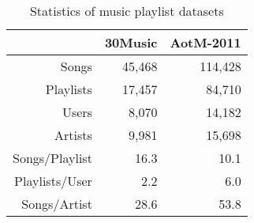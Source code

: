 \begin{table}[!t]
\centering
\caption{Statistics of music playlist datasets}
\label{tab:stats_pldata}
\begin{tabular}{rrr}
\toprule
               & 30Music & AotM-2011 \\
\midrule
Songs          & 45,468  & 114,428   \\
Playlists      & 17,457  & 84,710    \\
Users          & 8,070   & 14,182    \\
Artists        & 9,981   & 15,698    \\
Songs/Playlist & 16.3    & 10.1      \\
Playlists/User & 2.2     & 6.0       \\
Songs/Artist   & 28.6    & 53.8      \\
\bottomrule
\end{tabular}
\end{table}
